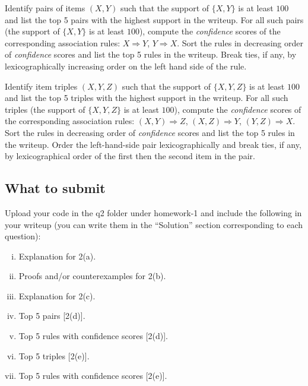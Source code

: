 \Solution{}

Identify pairs of items $(X,Y)$ such that the support of $\{X,Y\}$ is at least $100$ and list the top 5 pairs with the highest support in the writeup. For all such pairs (the support of $\{X,Y\}$ is at least $100$), compute the \textit{confidence} scores of the corresponding association rules: $X \Rightarrow Y$, $Y \Rightarrow X$. Sort the rules in decreasing order of  \textit{confidence} scores and list the top 5 rules in the writeup. Break ties, if any, by lexicographically increasing order on the left hand side of the rule. 

\Solution{}

Identify item triples $(X,Y,Z)$ such that the support of $\{X,Y,Z\}$ is at least $100$ and list the top 5 triples with the highest support in the writeup. For all such triples (the support of $\{X,Y,Z\}$ is at least $100$), compute the \textit{confidence} scores of the corresponding association rules: $(X,Y) \Rightarrow Z$, $(X,Z) \Rightarrow Y$, $(Y,Z) \Rightarrow X$. 
Sort the rules in decreasing order of \textit{confidence} scores and list the top 5 rules in the writeup. Order the left-hand-side pair lexicographically and break ties, if any, by lexicographical order of the first then the second item in the pair.

\Solution{}

\subsection*{What to submit}
Upload your code in the q2 folder under homework-1 and include the following in your writeup (you can write them in the ``\/Solution{}'' section corresponding to each question):
\begin{enumerate}[(i)]
\item Explanation for 2(a).
\item Proofs and/or counterexamples for 2(b).
\item Explanation for 2(c).
\item Top 5 pairs [2(d)].
\item Top 5 rules with confidence scores [2(d)].
\item Top 5 triples [2(e)].
\item Top 5 rules with confidence scores [2(e)].
\end{enumerate}


